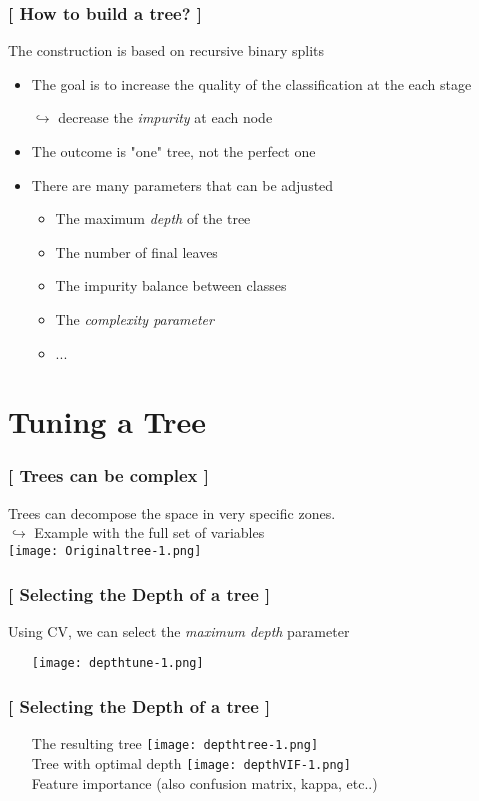 \documentclass[xcolor=x11names,compress, handhouts]{beamer}
\renewcommand{\(}{\begin{columns}}
\renewcommand{\)}{\end{columns}}
\newcommand{\<}[1]{\begin{column}{#1}}
\renewcommand{\>}{\end{column}}
\begin{document}
\begin{frame}
\frametitle{\textcolor{brique}{[ How to build a tree? ]}}
The construction is based on recursive binary splits
\pause
\begin{itemize}[<+->]
    \item The goal is to increase the quality of the classification at the each stage
    \item[$\hookrightarrow$] decrease the \textit{impurity} at each node
    \item The outcome is "one" tree, not the perfect one
    \item  There are many parameters that can be adjusted
    \begin{itemize}[<+->]
        \item The maximum \textit{depth} of the tree
        \item The number of final leaves
        \item The impurity balance between classes
        \item The \textit{complexity parameter}
        \item ...
    \end{itemize}
\end{itemize}
\end{frame}

\section{Tuning a Tree}

\begin{frame}
\frametitle{\textcolor{brique}{[ Trees can be complex ]}}
Trees can decompose the space in very specific zones.\\
 $\hookrightarrow$ Example with  the full set of variables\\

\texttt{[image: Originaltree-1.png]}
\end{frame}


\begin{frame}
\frametitle{\textcolor{brique}{[ Selecting the \textbf{Depth} of a tree ]}}
Using CV, we can select the \textit{maximum depth} parameter
\pause
\begin{itemize}[<+->]
    \item[] \texttt{[image: depthtune-1.png]}
\end{itemize}
\end{frame}


\begin{frame}
\frametitle{\textcolor{brique}{[ Selecting the \textbf{Depth} of a tree ]}}
\pause
\begin{itemize}
\item[] The resulting tree
   {\texttt{[image: depthtree-1.png]} \\ }
   {Tree with optimal depth}
   {\texttt{[image: depthVIF-1.png]} \\ }
   {Feature importance (also confusion matrix, kappa, etc..)}
\end{itemize}
\end{frame}
\end{document}
